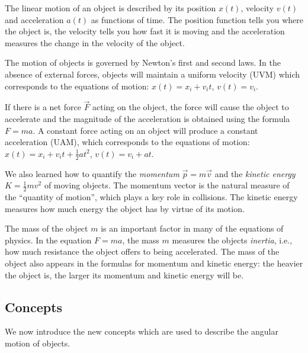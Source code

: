 \documentclass[letterpaper,9pt,journal]{IEEEtran}
\newcommand{\dokuitalic}[1]{\textsl{#1}}
\begin{document}
The linear motion of an object is described by its position $x(t)$,
velocity $v(t)$ and acceleration $a(t)$ as functions of time. 
The position function tells you where the object is, 
the velocity tells you how fast it is moving and 
the acceleration measures the change in the velocity of the object.

The motion of objects is governed by Newton's first and second laws.
In the absence of external forces, objects will maintain a uniform velocity (UVM)
which corresponds to the equations of motion: $x(t)=x_i+v_it$, $v(t)=v_i$.

If there is a net force $\vec{F}$ acting on the object, 
the force will cause the object to accelerate and the magnitude
of the acceleration is obtained using the formula $F=ma$.
A constant force acting on an object will produce a constant acceleration (UAM),
which corresponds to the equations of motion: $x(t)=x_i+v_it+\frac{1}{2}at^2$, $v(t)=v_i + at$.

We also learned how to quantify the \dokuitalic{momentum} $\vec{p}=m\vec{v}$ and 
the \dokuitalic{kinetic energy} $K=\frac{1}{2}mv^2$ of moving objects.
The momentum vector is the natural measure of the ``quantity of motion'',
which plays a key role in collisions.
The kinetic energy measures how much energy the object has by virtue of its motion. 

The mass of the object $m$ is an important factor in many of the equations of physics.
In the equation $F=ma$, the mass $m$ measures the objects \dokuitalic{inertia},
i.e., how much resistance the object offers to being accelerated. 
The mass of the object also appears in the formulas for momentum and kinetic energy:
the heavier the object is, the larger its momentum and kinetic energy will be.

\vspace{-3mm}
\subsection{Concepts}
\label{ff4e01de0bd379280a0157bd102cc5f0}%

We now introduce the new concepts which are used to describe the angular motion of objects.
\end{document}
